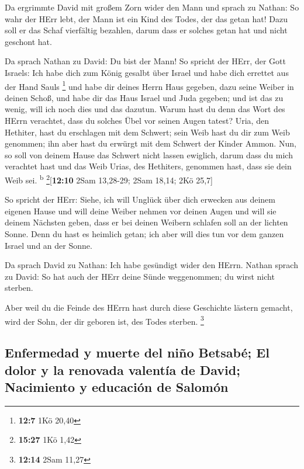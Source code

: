  Da ergrimmte David mit großem Zorn wider den Mann und
sprach zu Nathan: So wahr der HErr lebt, der Mann ist ein Kind des
Todes, der das getan hat!  Dazu soll er das Schaf
vierfältig bezahlen, darum dass er solches getan hat und nicht geschont
hat.

 Da sprach Nathan zu David: Du bist der Mann! So spricht
der HErr, der Gott Israels: Ich habe dich zum König gesalbt über Israel
und habe dich errettet aus der Hand Sauls \footnote{\textbf{12:7} 1Kö
  20,40}  und habe dir deines Herrn Haus gegeben, dazu
seine Weiber in deinen Schoß, und habe dir das Haus Israel und Juda
gegeben; und ist das zu wenig, will ich noch dies und das dazutun.
 Warum hast du denn das Wort des HErrn verachtet, dass du
solches Übel vor seinen Augen tatest? Uria, den Hethiter, hast du
erschlagen mit dem Schwert; sein Weib hast du dir zum Weib genommen; ihn
aber hast du erwürgt mit dem Schwert der Kinder Ammon. 
Nun, so soll von deinem Hause das Schwert nicht lassen ewiglich, darum
dass du mich verachtet hast und das Weib Urias, des Hethiters, genommen
hast, dass sie dein Weib sei. \textsuperscript{b}
\footnote{\textbf{15:27} 1Kö 1,42}{[}\textbf{12:10} 2Sam 13,28-29; 2Sam
18,14; 2Kö 25,7{]}

 So spricht der HErr: Siehe, ich will Unglück über dich
erwecken aus deinem eigenen Hause und will deine Weiber nehmen vor
deinen Augen und will sie deinem Nächsten geben, dass er bei deinen
Weibern schlafen soll an der lichten Sonne.  Denn du hast
es heimlich getan; ich aber will dies tun vor dem ganzen Israel und an
der Sonne.

 Da sprach David zu Nathan: Ich habe gesündigt wider den
HErrn. Nathan sprach zu David: So hat auch der HErr deine Sünde
weggenommen; du wirst nicht sterben.

 Aber weil du die Feinde des HErrn hast durch diese
Geschichte lästern gemacht, wird der Sohn, der dir geboren ist, des
Todes sterben. \footnote{\textbf{12:14} 2Sam 11,27}

\hypertarget{enfermedad-y-muerte-del-niuxf1o-betsabuxe9-el-dolor-y-la-renovada-valentuxeda-de-david-nacimiento-y-educaciuxf3n-de-salomuxf3n}{%
\subsection{Enfermedad y muerte del niño Betsabé; El dolor y la renovada
valentía de David; Nacimiento y educación de
Salomón}\label{enfermedad-y-muerte-del-niuxf1o-betsabuxe9-el-dolor-y-la-renovada-valentuxeda-de-david-nacimiento-y-educaciuxf3n-de-salomuxf3n}}

